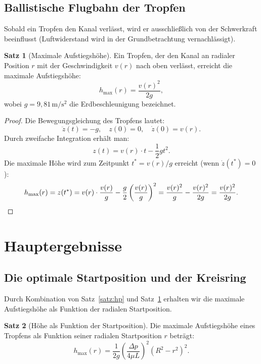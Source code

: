 ﻿\documentclass[a4paper,12pt]{article}
\theoremstyle{definition}
\newtheorem{satz}{Satz}
\begin{document}
\subsection{Ballistische Flugbahn der Tropfen}

Sobald ein Tropfen den Kanal verlässt, wird er ausschließlich von der Schwerkraft beeinflusst
(Luftwiderstand wird in der Grundbetrachtung vernachlässigt).

\begin{satz}[Maximale Aufstiegshöhe]
\label{satz:hoehe}
    Ein Tropfen, der den Kanal an radialer Position $r$ mit der Geschwindigkeit $v(r)$
    nach oben verlässt, erreicht die maximale Aufstiegshöhe:
    \[
    h_{\max}(r) = \frac{v(r)^2}{2g},
    \]
    wobei $g = 9{,}81\,\mathrm{m/s^2}$ die Erdbeschleunigung bezeichnet.
\end{satz}

\begin{proof}
Die Bewegungsgleichung des Tropfens lautet:
\[
\ddot{z}(t) = -g, \quad z(0) = 0, \quad \dot{z}(0) = v(r).
\]
Durch zweifache Integration erhält man:
\[
z(t) = v(r) \cdot t - \frac{1}{2}g t^2.
\]
Die maximale Höhe wird zum Zeitpunkt $t^* = v(r)/g$ erreicht (wenn $\dot{z}(t^*) = 0$):
\[
h_{\max}(r) = z(t^*) = v(r) \cdot \frac{v(r)}{g} - \frac{g}{2}\left(\frac{v(r)}{g}\right)^2
= \frac{v(r)^2}{g} - \frac{v(r)^2}{2g} = \frac{v(r)^2}{2g}. \qedhere
\]
\end{proof}

\section{Hauptergebnisse}

\subsection{Die optimale Startposition und der Kreisring}

Durch Kombination von Satz~\ref{satz:hp} und Satz~\ref{satz:hoehe} erhalten wir die
maximale Aufstiegshöhe als Funktion der radialen Startposition.

\begin{satz}[Höhe als Funktion der Startposition]
\label{satz:hoehe_r}
    Die maximale Aufstiegshöhe eines Tropfens als Funktion seiner radialen Startposition $r$
    beträgt:
    \[
    h_{\max}(r) = \frac{1}{2g}\left(\frac{\Delta p}{4\mu L}\right)^2 \left(R^2 - r^2\right)^2.
    \]
\end{satz}
\end{document}

